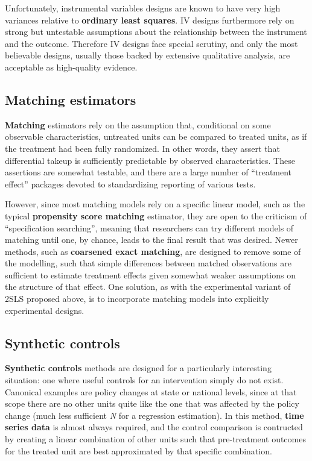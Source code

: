 Unfortunately, instrumental variables designs are known
to have very high variances relative to \textbf{ordinary least squares}.\cite{young2017consistency}
IV designs furthermore rely on strong but untestable assumptions
about the relationship between the instrument and the outcome.\cite{bound1995problems}
Therefore IV designs face special scrutiny,
and only the most believable designs,
usually those backed by extensive qualitative analysis,
are acceptable as high-quality evidence.

\subsection{Matching estimators}

\textbf{Matching} estimators rely on the assumption that,
conditional on some observable characteristics,
untreated units can be compared to treated units,
as if the treatment had been fully randomized.
In other words, they assert that differential takeup
is sufficiently predictable by observed characteristics.
These assertions are somewhat testable,
and there are a large number of ``treatment effect''
packages devoted to standardizing reporting of various tests.

However, since most matching models rely on a specific linear model,
such as the typical \textbf{propensity score matching} estimator,
they are open to the criticism of ``specification searching'',
meaning that researchers can try different models of matching
until one, by chance, leads to the final result that was desired.
Newer methods, such as \textbf{coarsened exact matching}\cite{iacus2012causal},
are designed to remove some of the modelling,
such that simple differences between matched observations
are sufficient to estimate treatment effects
given somewhat weaker assumptions on the structure of that effect.
One solution, as with the experimental variant of 2SLS proposed above,
is to incorporate matching models into explicitly experimental designs.

\subsection{Synthetic controls}

\textbf{Synthetic controls} methods\cite{abadie2015comparative}
are designed for a particularly interesting situation:
one where useful controls for an intervention simply do not exist.
Canonical examples are policy changes at state or national levels,
since at that scope there are no other units quite like
the one that was affected by the policy change
(much less sufficient \textit{N} for a regression estimation).\cite{gobillon2016regional}
In this method, \textbf{time series data} is almost always required,
and the control comparison is contructed by creating
a linear combination of other units such that pre-treatment outcomes
for the treated unit are best approximated by that specific combination.
